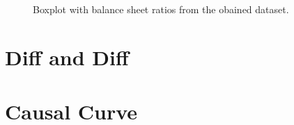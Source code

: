 \begin{figure}
\centering
{}%

\decoRule
\caption[Balance sheet ratios]{Boxplot with balance sheet ratios from the obained dataset.}
\label{fig:Ratios}
\end{figure}



\section{Diff and Diff}




\section{Causal Curve}

